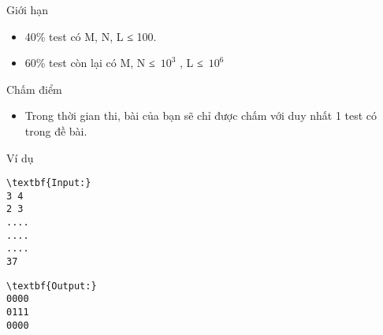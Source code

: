 Giới hạn
\begin{itemize}
	\item 40\% test có M, N, L ≤ 100.
	\item 60\% test còn lại có M, N ≤ $10^{3}$ , L ≤ $10^{6}$
\end{itemize}
Chấm điểm
\begin{itemize}
	\item Trong thời gian thi, bài của bạn sẽ chỉ được chấm với duy nhất 1 test có trong đề bài.
\end{itemize}
Ví dụ
\begin{verbatim}
\textbf{Input:}
3 4
2 3
....
....
....
37\end{verbatim}
\begin{verbatim}
\textbf{Output:}
0000
0111
0000
\end{verbatim}
